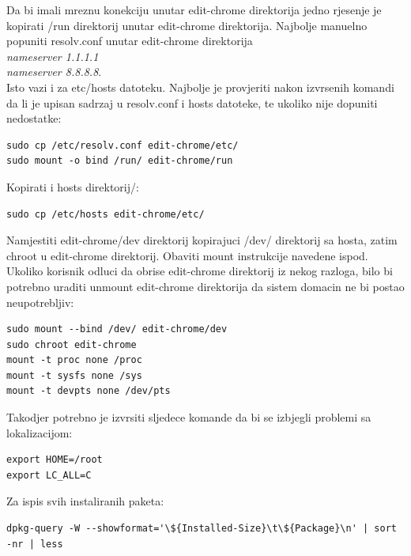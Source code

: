 \documentclass[12pt,vi]{mitthesis}
\begin{document}
\noindent
Da bi imali mreznu konekciju unutar edit-chrome direktorija jedno rjesenje je kopirati /run direktorij unutar edit-chrome direktorija.
Najbolje manuelno popuniti resolv.conf unutar edit-chrome direktorija \\\textit{nameserver 1.1.1.1 \\
nameserver 8.8.8.8}.\\
Isto vazi i za etc/hosts datoteku. Najbolje je provjeriti nakon izvrsenih komandi da li je upisan sadrzaj u resolv.conf i hosts datoteke, te ukoliko nije dopuniti nedostatke:
\begin{lstlisting}[style=BashInputStyle]
sudo cp /etc/resolv.conf edit-chrome/etc/
sudo mount -o bind /run/ edit-chrome/run
\end{lstlisting}

\noindent
Kopirati i hosts direktorij/:
\begin{lstlisting}[style=BashInputStyle]
sudo cp /etc/hosts edit-chrome/etc/
\end{lstlisting}

\noindent
Namjestiti edit-chrome/dev direktorij kopirajuci /dev/ direktorij sa hosta, zatim chroot u edit-chrome direktorij.
Obaviti mount instrukcije navedene ispod. Ukoliko korisnik odluci da obrise edit-chrome direktorij iz nekog razloga,
bilo bi potrebno uraditi unmount edit-chrome direktorija da sistem domacin ne bi postao neupotrebljiv:
\begin{lstlisting}[style=BashInputStyle]
sudo mount --bind /dev/ edit-chrome/dev
sudo chroot edit-chrome
mount -t proc none /proc
mount -t sysfs none /sys
mount -t devpts none /dev/pts
\end{lstlisting}

\noindent
Takodjer potrebno je izvrsiti sljedece komande da bi se izbjegli problemi sa lokalizacijom:
\begin{lstlisting}[style=BashInputStyle]
export HOME=/root
export LC_ALL=C
\end{lstlisting}

\noindent
Za ispis svih instaliranih paketa:
\begin{lstlisting}[style=BashInputStyle]
dpkg-query -W --showformat='\${Installed-Size}\t\${Package}\n' | sort -nr | less
\end{lstlisting}
\end{document}
